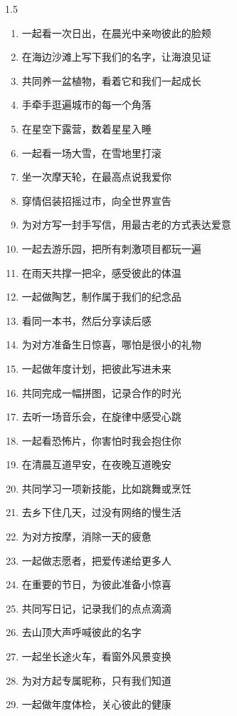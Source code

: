 \clearpage

\subtitle{我要和你做的一百件事}

\large
\begin{spacing}{1.5}
\begin{enumerate}
    \item 一起看一次日出，在晨光中亲吻彼此的脸颊
    \item 在海边沙滩上写下我们的名字，让海浪见证
    \item 共同养一盆植物，看着它和我们一起成长
    \item 手牵手逛遍城市的每一个角落
    \item 在星空下露营，数着星星入睡
    \item 一起看一场大雪，在雪地里打滚
    \item 坐一次摩天轮，在最高点说我爱你
    \item 穿情侣装招摇过市，向全世界宣告
    \item 为对方写一封手写信，用最古老的方式表达爱意
    \item 一起去游乐园，把所有刺激项目都玩一遍
    \item 在雨天共撑一把伞，感受彼此的体温
    \item 一起做陶艺，制作属于我们的纪念品
    \item 看同一本书，然后分享读后感
    \item 为对方准备生日惊喜，哪怕是很小的礼物
    \item 一起做年度计划，把彼此写进未来
    \item 共同完成一幅拼图，记录合作的时光
    \item 去听一场音乐会，在旋律中感受心跳
    \item 一起看恐怖片，你害怕时我会抱住你
    \item 在清晨互道早安，在夜晚互道晚安
    \item 共同学习一项新技能，比如跳舞或烹饪
    \item 去乡下住几天，过没有网络的慢生活
    \item 为对方按摩，消除一天的疲惫
    \item 一起做志愿者，把爱传递给更多人
    \item 在重要的节日，为彼此准备小惊喜
    \item 共同写日记，记录我们的点点滴滴
    \item 去山顶大声呼喊彼此的名字
    \item 一起坐长途火车，看窗外风景变换
    \item 为对方起专属昵称，只有我们知道
    \item 一起做年度体检，关心彼此的健康

\end{enumerate}
\end{spacing}
